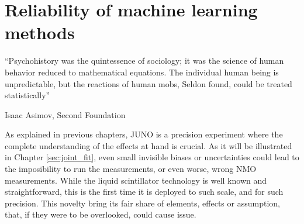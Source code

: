 \documentclass[../main.tex]{subfiles}
\begin{document}
\chapter{Reliability of machine learning methods}
\label{sec:janne}

\epigraph{``Psychohistory was the quintessence of sociology; it was the science of human behavior reduced to mathematical equations. The individual human being is unpredictable, but the reactions of human mobs, Seldon found, could be treated statistically''}{Isaac Asimov, Second Foundation}

\minitoc
%
%
%
%
%
As explained in previous chapters, JUNO is a precision experiment where the complete understanding of the effects at hand is crucial. As it will be illustrated in Chapter \ref{sec:joint_fit}, even small invisible biases or uncertainties could lead to the imposibility to run the measurements, or even worse, wrong NMO measurements. While the liquid scintillator technology is well known and straightforward, this is the first time it is deployed to such scale, and for such precision. This novelty bring its fair share of elements, effects or assumption, that, if they were to be overlooked, could cause issue.
\end{document}
